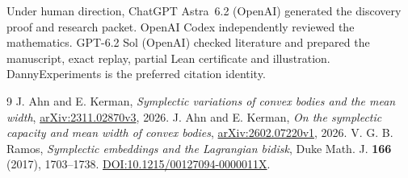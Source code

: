 \documentclass[11pt,a4paper]{amsart}
\begin{document}
Under human direction, ChatGPT Astra~6.2 (OpenAI) generated the discovery proof and research packet. OpenAI Codex independently reviewed the mathematics. GPT-6.2 Sol (OpenAI) checked literature and prepared the manuscript, exact replay, partial Lean certificate and illustration. DannyExperiments is the preferred citation identity.

\begin{thebibliography}{9}
 J. Ahn and E. Kerman, \emph{Symplectic variations of convex bodies and the mean width}, \href{https://arxiv.org/abs/2311.02870v3}{arXiv:2311.02870v3}, 2026.
 J. Ahn and E. Kerman, \emph{On the symplectic capacity and mean width of convex bodies}, \href{https://arxiv.org/abs/2602.07220v1}{arXiv:2602.07220v1}, 2026.
 V. G. B. Ramos, \emph{Symplectic embeddings and the Lagrangian bidisk}, Duke Math. J. \textbf{166} (2017), 1703--1738. \href{https://doi.org/10.1215/00127094-0000011X}{DOI:10.1215/00127094-0000011X}.
\end{thebibliography}
\end{document}
